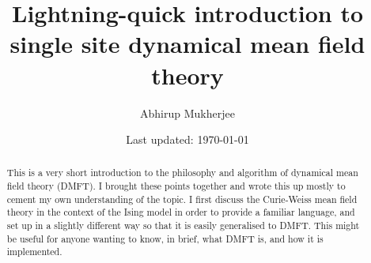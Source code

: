 \documentclass[12pt,onecolumn]{revtex4-2}
\begin{document}
\title{\bf Lightning-quick introduction to single site dynamical mean field theory}
\author{Abhirup Mukherjee}
\date{Last updated: \today}
\begin{abstract}
This is a very short introduction to the philosophy and algorithm of dynamical mean field theory (DMFT). I brought these points together and wrote this up mostly to cement my own understanding of the topic. I first discuss the Curie-Weiss mean field theory in the context of the Ising model in order to provide a familiar language, and set up in a slightly different way so that it is easily generalised to DMFT. This might be useful for anyone wanting to know, in brief, what DMFT is, and how it is implemented.
\end{abstract}
\maketitle

\tableofcontents
\end{document}
